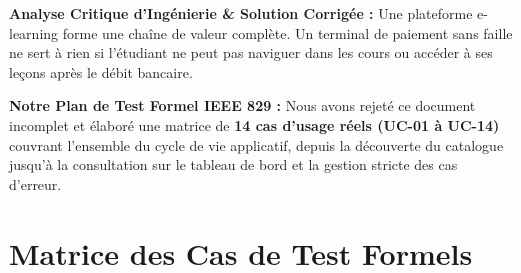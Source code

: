 \documentclass[11pt, a4paper, openany]{report}
\begin{document}
\begin{engSolutionBox}
\textbf{Analyse Critique d'Ingénierie \& Solution Corrigée :}
Une plateforme e-learning forme une chaîne de valeur complète. Un terminal de paiement sans faille ne sert à rien si l'étudiant ne peut pas naviguer dans les cours ou accéder à ses leçons après le débit bancaire.

\textbf{Notre Plan de Test Formel IEEE 829 :}
Nous avons rejeté ce document incomplet et élaboré une matrice de \textbf{14 cas d'usage réels (UC-01 à UC-14)} couvrant l'ensemble du cycle de vie applicatif, depuis la découverte du catalogue jusqu'à la consultation sur le tableau de bord et la gestion stricte des cas d'erreur.
\end{engSolutionBox}

\section{Matrice des Cas de Test Formels}
\end{document}

